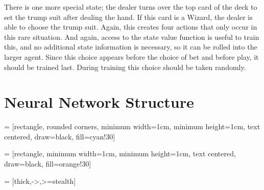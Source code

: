\documentclass[10pt]{article} %
\begin{document}
There is one more special state; the dealer turns over the top card of the deck to set the trump suit after dealing the hand. If this card is a Wizard, the dealer is able to choose the trump suit. Again, this creates four actions that only occur in this rare situation. And again, access to the state value function is useful to train this, and no additional state information is necessary, so it can be rolled into the larger agent. Since this choice appears before the choice of bet and before play, it should be trained last. During training this choice should be taken randomly.

\clearpage

\section{Neural Network Structure}

 = [rectangle, rounded corners, 
minimum width=1cm, 
minimum height=1cm,
text centered, 
draw=black, 
fill=cyan!30]

 = [rectangle, 
minimum width=1cm, 
minimum height=1cm, 
text centered,  
draw=black, 
fill=orange!30]

 = [thick,->,>=stealth]
\end{document}
